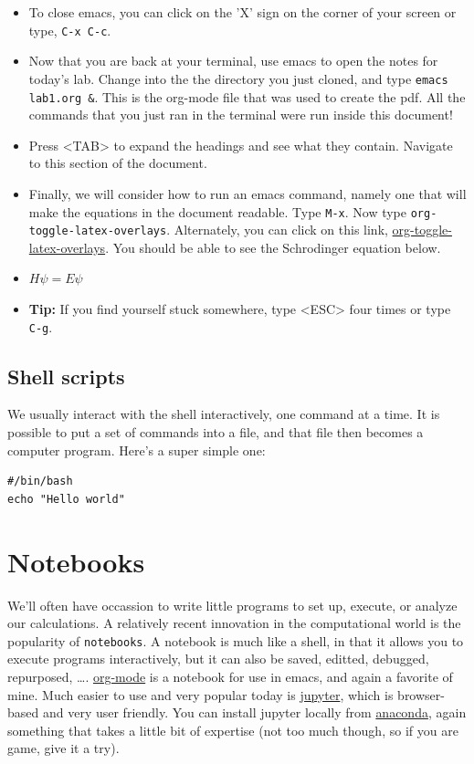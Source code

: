 \documentclass[11pt]{article}
\begin{document}
\begin{itemize}
\item To close emacs, you can click on the 'X' sign on the corner of your screen or type, \texttt{C-x C-c}.

\item Now that you are back at your terminal, use emacs to open the notes for today's lab. Change into the the directory you just cloned, and type \texttt{emacs lab1.org \&}. This is the org-mode file that was used to create the pdf. All the commands that you just ran in the terminal were run inside this document!

\item Press <TAB> to expand the headings and see what they contain. Navigate to this section of the document.

\item Finally, we will consider how to run an emacs command, namely one that will make the equations in the document readable. Type \texttt{M-x}. Now type \texttt{org-toggle-latex-overlays}. Alternately, you can click on this link, \url{org-toggle-latex-overlays}. You should be able to see the Schrodinger equation below.

\item \(H\psi = E\psi\)

\item \textbf{Tip:} If you find yourself stuck somewhere, type <ESC> four times or type \texttt{C-g}.
\end{itemize}


\subsection{Shell scripts}
\label{sec:org46a7142}
We usually interact with the shell interactively, one command at a time.  It is possible
to put a set of commands into a file, and that file then becomes a computer program.
Here's a super simple one:

\begin{verbatim}
#/bin/bash
echo "Hello world"
\end{verbatim}

\section{Notebooks}
\label{sec:orga81ac94}
We'll often have occassion to write little programs to set up, execute, or analyze our
calculations.  A relatively recent innovation in the computational world is the popularity
of \texttt{notebooks}. A notebook is much like a shell, in that it allows you to execute programs
interactively, but it can also be saved, editted, debugged, repurposed, \ldots{}.  \href{https://orgmode.org/}{org-mode} is
a notebook for use in emacs, and again a favorite of mine.  Much easier to use and very
popular today is \href{https://jupyter.org/}{jupyter}, which is browser-based and very user friendly.  You can install
jupyter locally from \href{https://www.anaconda.com/distribution/}{anaconda}, again something that takes a little bit of expertise (not
too much though, so if you are game, give it a try).
\end{document}
